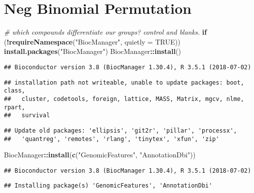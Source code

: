 \documentclass[]{article}
\newenvironment{Shaded}{\begin{snugshade}}{\end{snugshade}}
\newcommand{\KeywordTok}[1]{\textcolor[rgb]{0.13,0.29,0.53}{\textbf{#1}}}
\newcommand{\DataTypeTok}[1]{\textcolor[rgb]{0.13,0.29,0.53}{#1}}
\newcommand{\StringTok}[1]{\textcolor[rgb]{0.31,0.60,0.02}{#1}}
\newcommand{\CommentTok}[1]{\textcolor[rgb]{0.56,0.35,0.01}{\textit{#1}}}
\newcommand{\OtherTok}[1]{\textcolor[rgb]{0.56,0.35,0.01}{#1}}
\newcommand{\ControlFlowTok}[1]{\textcolor[rgb]{0.13,0.29,0.53}{\textbf{#1}}}
\newcommand{\OperatorTok}[1]{\textcolor[rgb]{0.81,0.36,0.00}{\textbf{#1}}}
\newcommand{\NormalTok}[1]{#1}
\begin{document}
\section{Neg Binomial Permutation}\label{neg-binomial-permutation}

\begin{Shaded}
\begin{Highlighting}[]
\CommentTok{# which compounds differentiate our groups? control and blanks.}
\ControlFlowTok{if}\NormalTok{ (}\OperatorTok{!}\KeywordTok{requireNamespace}\NormalTok{(}\StringTok{"BiocManager"}\NormalTok{, }\DataTypeTok{quietly =} \OtherTok{TRUE}\NormalTok{))}
    \KeywordTok{install.packages}\NormalTok{(}\StringTok{"BiocManager"}\NormalTok{)}
\NormalTok{BiocManager}\OperatorTok{::}\KeywordTok{install}\NormalTok{()}
\end{Highlighting}
\end{Shaded}

\begin{verbatim}
## Bioconductor version 3.8 (BiocManager 1.30.4), R 3.5.1 (2018-07-02)
\end{verbatim}

\begin{verbatim}
## installation path not writeable, unable to update packages: boot, class,
##   cluster, codetools, foreign, lattice, MASS, Matrix, mgcv, nlme, rpart,
##   survival
\end{verbatim}

\begin{verbatim}
## Update old packages: 'ellipsis', 'git2r', 'pillar', 'processx',
##   'quantreg', 'remotes', 'rlang', 'tinytex', 'xfun', 'zip'
\end{verbatim}

\begin{Shaded}
\begin{Highlighting}[]
\NormalTok{BiocManager}\OperatorTok{::}\KeywordTok{install}\NormalTok{(}\KeywordTok{c}\NormalTok{(}\StringTok{"GenomicFeatures"}\NormalTok{, }\StringTok{"AnnotationDbi"}\NormalTok{))}
\end{Highlighting}
\end{Shaded}

\begin{verbatim}
## Bioconductor version 3.8 (BiocManager 1.30.4), R 3.5.1 (2018-07-02)
\end{verbatim}

\begin{verbatim}
## Installing package(s) 'GenomicFeatures', 'AnnotationDbi'
\end{verbatim}
\end{document}
